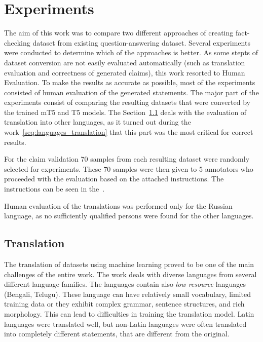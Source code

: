 \chapter{Experiments}\label{c7}
The aim of this work was to compare two different approaches of creating fact-checking dataset from existing question-answering dataset. Several experiments were conducted to determine which of the approaches is better. As some stepts of dataset conversion are not easily evaluated automatically (such as translation evaluation and correctness of generated claims), this work resorted to Human Evaluation. To make the results as accurate as possible, most of the experiments consisted of human evaluation of the generated statements. The major part of the experiments consist of comparing the resulting datasets that were converted by the trained mT5 and T5 models. The Section~\ref{human_translation} deals with the evaluation of translation into other languages, as it turned out during the work~\ref{seq:languages_translation} that this part was the most critical for correct results.

For the claim validation 70 samples from each resulting dataset were randomly selected for experiments. These 70 samples were then given to 5 annotators who proceeded with the evaluation based on the attached instructions. The instructions can be seen in the~{\hypersetup{hidelinks}}.

Human evaluation of the translations was performed only for the Russian language, as no sufficiently qualified persons were found for the other languages.
\section{Translation} \label{human_translation}
The translation of datasets using machine learning proved to be one of the main challenges of the entire work. The work deals with diverse languages from several different language families. The languages contain also \emph{low-resource} languages (Bengali, Telugu). These language can have relatively small vocabulary, limited training data or they exhibit complex grammar, sentence structures, and rich morphology. This can lead to difficulties in training the translation model. Latin languages were translated well, but non-Latin languages were often translated into completely different statements, that are different from the original.

